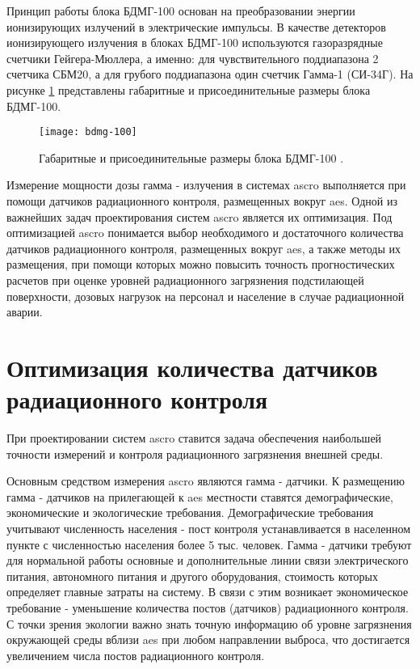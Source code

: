 Принцип работы блока БДМГ-100 основан на преобразовании энергии ионизирующих излучений в электрические импульсы. В 
качестве детекторов ионизирующего излучения в блоках БДМГ-100 используются газоразрядные счетчики Гейгера-Мюллера, а 
именно: для чувствительного поддиапазона 2 счетчика СБМ20, а для грубого поддиапазона один счетчик Гамма-1 (СИ-34Г). На 
рисунке \ref{fig_bdmg_100} представлены габаритные и присоединительные размеры блока БДМГ-100.

\begin{figure}[ht!]
    \centering
    \texttt{[image: bdmg-100]}
    \captionsetup{justification=centering}
    \caption{Габаритные и присоединительные размеры блока БДМГ-100 \cite{bdmg-100}.}
    \label{fig_bdmg_100}
\end{figure}

Измерение мощности дозы гамма - излучения в системах \ac{ascro} выполняется при помощи датчиков радиационного контроля, 
размещенных вокруг \ac{aes}. Одной из важнейших задач проектирования систем \ac{ascro} является их оптимизация. Под 
оптимизацией \ac{ascro} понимается выбор необходимого и достаточного количества датчиков радиационного контроля, 
размещенных вокруг \ac{aes}, а также методы их размещения, при помощи которых можно повысить точность прогностических 
расчетов при оценке уровней радиационного загрязнения подстилающей поверхности, дозовых нагрузок на персонал и население 
в случае радиационной аварии.

\section{Оптимизация количества датчиков радиационного контроля}

При проектировании систем \ac{ascro} ставится задача обеспечения наибольшей точности измерений и контроля радиационного 
загрязнения внешней среды. 

Основным средством измерения \ac{ascro} являются гамма - датчики. К размещению гамма - датчиков на прилегающей к \ac{aes} 
местности ставятся демографические, экономические и экологические требования. Демографические требования учитывают 
численность населения - пост контроля устанавливается в населенном пункте с численностью населения более 5 тыс. человек. 
Гамма - датчики требуют для нормальной работы основные и дополнительные линии связи электрического питания, автономного 
питания и другого оборудования, стоимость которых определяет главные затраты на систему. В связи с этим возникает 
экономическое требование - уменьшение количества постов (датчиков) радиационного контроля. С точки зрения экологии 
важно знать точную информацию об уровне загрязнения окружающей среды вблизи \ac{aes} при любом направлении выброса, что 
достигается увеличением числа постов радиационного контроля.

